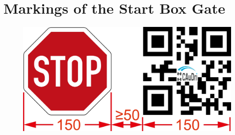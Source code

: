 \section{Markings of the Start Box Gate}
\label{fig_start_box_markings}
\begin{figure}[H]
	\begin{center}
		\centering\includegraphics[width=\textwidth]{graphics/Abb_23_start_box_markings.jpg}
	\end{center}
\end{figure}